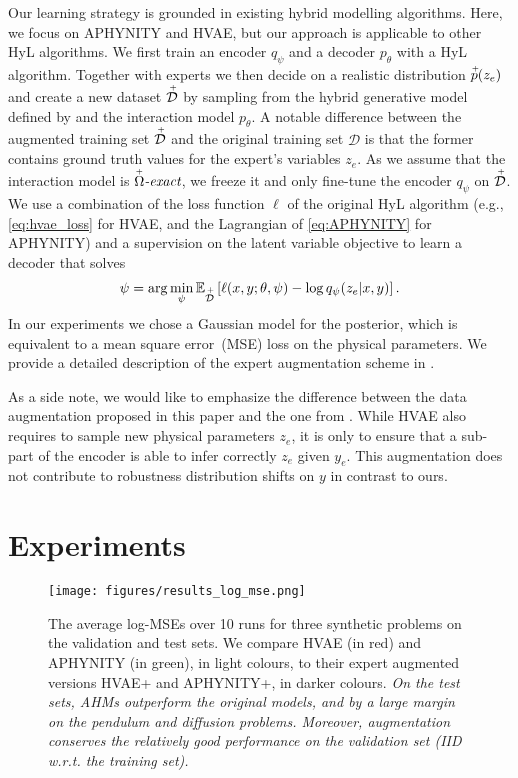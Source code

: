 Our learning strategy is grounded in existing hybrid modelling algorithms. Here, we focus on APHYNITY and HVAE, but our approach is applicable to other HyL algorithms. We first train an encoder $q_\psi$ and a decoder $p_\theta$ with a HyL algorithm. Together with experts we then decide on a realistic distribution $\accentset{+}{p}(z_e)$ and create a new dataset $\accentset{+}{\mathcal{D}}$ by sampling from the hybrid generative model defined by  and the interaction model $p_\theta$. A notable difference between the augmented training set $\accentset{+}{\mathcal{D}}$ and the original training set $\mathcal{D}$ is that the former contains ground truth values for the expert's variables $z_e$. As we assume that the interaction model is $\accentset{+}{\Omega}\textit{-exact}$, we freeze it and only fine-tune the encoder $q_\psi$ on $\accentset{+}{\mathcal{D}}$. We use a combination of the loss function $\ell$ of the original HyL algorithm (e.g., \eqref{eq:hvae_loss} for HVAE, and the Lagrangian of \eqref{eq:APHYNITY} for APHYNITY) and a supervision on the latent variable objective to learn a decoder that solves
\begin{align}
    \psi = \arg\min_{\psi} \mathbb{E}_{\accentset{+}{\mathcal{D}}}\left[ \ell(x, y; \theta, \psi) - \log q_\psi(z_e|x, y) \right]. \nonumber
\end{align}
In our experiments we chose a Gaussian model for the posterior, which is equivalent to a mean square error~(MSE) loss on the physical parameters. We provide a detailed description of the expert augmentation scheme in .

As a side note, we would like to emphasize the difference between the data augmentation proposed in this paper and the one from \citet{HVAE}. While HVAE also requires to sample new physical parameters $z_e$, it is only to ensure that a sub-part of the encoder is able to infer correctly $z_e$ given $y_e$. This augmentation does not contribute to robustness distribution shifts on $y$ in contrast to ours.

\section{Experiments}
\begin{figure*}
    \centering
    \texttt{[image: figures/results\_log\_mse.png]}
    \vspace{-1em}
    \caption{The average log-MSEs over 10 runs for three synthetic problems on the validation and test sets. We compare HVAE (in red) and APHYNITY (in green), in light colours, to their expert augmented versions HVAE+ and APHYNITY+, in darker colours. \textit{On the test sets, AHMs outperform the original models, and by a large margin on the pendulum and diffusion problems. Moreover, augmentation conserves the relatively good performance on the validation set (IID w.r.t. the training set).}}
    \label{fig:log_mse}
    \vspace{-1.em}
\end{figure*}


